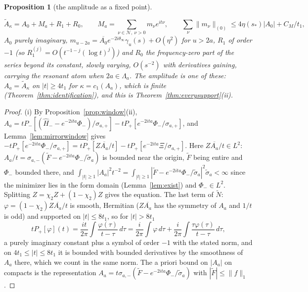 \documentclass[11pt]{article}
\newtheorem{proposition}[theorem]{Proposition}
\theoremstyle{definition}
\theoremstyle{remark}
\begin{document}
\begin{proposition}[the amplitude as a fixed point]
\begin{enumerate}
\[
\tilde A_\kappa=A_0+M_a+R_1+R_0,\qquad M_a=\sum_{\nu\in\mathcal N,\ \nu>0}m_\nu e^{it\nu},\qquad\sum_\nu\|m_\nu\|_{(0)}\le4\eta(s_*)|A_0|+C_M/t_1,
\]
$A_0$ purely imaginary, $m_{u-2a}=\overline{A_0}e^{-2i\theta_\infty}\gamma_u(s)+O(\eta^2)$ for $u>2a$, $R_1$ of order $-1$ (so $R_1^{(j)}=O(t^{-1-j}(\log t)^j)$) and $R_0$ the frequency-zero part of the series beyond its constant, slowly varying, $O(s^{-2})$ with derivatives gaining, carrying the resonant atom when $2a\in\Lambda_a$. The amplitude is one of these: $A_a=\tilde A_\kappa$ on $|t|\ge4t_1$ for $\kappa=c_1(A_a)$, which is finite (Theorem~\ref{thm:identification}), and this is Theorem~\ref{thm:everysupport}(ii).
\end{enumerate}
\end{proposition}
\begin{proof}
(i) By Proposition~\ref{prop:window}(ii), $A_a=tP_-[(\hat H_--e^{-2ita}\Phi_-)/\sigma_{a,+}]-tP_+[e^{-2ita}\Phi_-/\sigma_{a,+}]$, and Lemma~\ref{lem:mirrorwindow} gives $-tP_+[e^{-2ita}\Phi_-/\sigma_{a,+}]=tP_+[Z\overline{A_a}/t]-tP_+[e^{-2ita}\Xi/\sigma_{a,+}]$. Here $Z\overline{A_a}/t\in L^2$: $A_a/t=\sigma_{a,-}(\tilde F-e^{-2ita}\Phi_-/\tilde\sigma_a)$ is bounded near the origin, $\tilde F$ being entire and $\Phi_-$ bounded there, and $\int_{|t|\ge1}|A_a|^2t^{-2}=\int_{|t|\ge1}|\tilde F-e^{-2ita}\Phi_-/\tilde\sigma_a|^2\tilde\sigma_a<\infty$ since the minimizer lies in the form domain (Lemma~\ref{lem:exist}) and $\Phi_-\in L^2$. Splitting $Z=\chi_2Z+(1-\chi_2)Z$ gives the equation. The last term of $\tilde N$: $\varphi=(1-\chi_2)Z\overline{A_a}/t$ is smooth, Hermitian ($Z\overline{A_a}$ has the symmetry of $A_a$ and $1/t$ is odd) and supported on $|t|\le8t_1$, so for $|t|>8t_1$
\[
tP_+[\varphi](t)=\frac{it}{2\pi}\int\frac{\varphi(\tau)}{t-\tau}\,d\tau=\frac i{2\pi}\int\varphi\,d\tau+\frac i{2\pi}\int\frac{\tau\varphi(\tau)}{t-\tau}\,d\tau ,
\]
a purely imaginary constant plus a symbol of order $-1$ with the stated norm, and on $4t_1\le|t|\le8t_1$ it is bounded with bounded derivatives by the smoothness of $A_a$ there, which we count in the same norm. The a priori bound on $|A_a|$ on compacts is the representation $A_a=t\sigma_{a,-}(\tilde F-e^{-2ita}\Phi_-/\tilde\sigma_a)$ with $|\tilde F|\le\|f\|_1$.


\end{proof}
\end{document}
